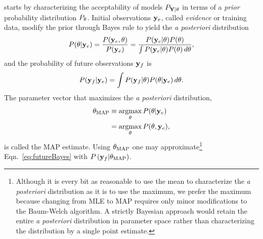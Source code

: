  starts by characterizing the
acceptability of models $P_{{\bf Y}|\theta}$ in terms of a
\emph{prior} probability distribution $P_{\theta}$.  Initial
observations $\mathbf{y}_e$, called \emph{evidence} or training data, modify
the prior through Bayes rule to yield the \emph{a posteriori}
distribution
\begin{equation}
  \label{eq:posteriori}
  P(\theta|\mathbf{y}_e) = \frac{P(\mathbf{y}_e,\theta)}{P(\mathbf{y}_e)} =
  \frac{P(\mathbf{y}_e|\theta)P(\theta)}{\int P(\mathbf{y}_e|\theta)P(\theta)\,
  d\theta},
\end{equation}
and the probability of future observations $\mathbf{y}_f$ is
\begin{equation}
  \label{eq:futureBayes}
  P(\mathbf{y}_f|\mathbf{y}_e) = \int  P(\mathbf{y}_f|\theta) P(\theta|\mathbf{y}_e)\, d\theta.
\end{equation}
The parameter vector that maximizes the \emph{a posteriori}
 distribution,
\begin{subequations}
  \begin{align}
    \label{eq:MAPdefa}
    \theta_{\text{MAP}} &\equiv \operatorname*{argmax}_\theta P(\theta|\mathbf{y}_e) \\
    \label{eq:MAPdefb}
    &= \operatorname*{argmax}_\theta P(\theta,\mathbf{y}_e),
  \end{align}
\end{subequations}
is called the MAP estimate.   Using $\theta_{\text{MAP}}$ one may
approximate\footnote{Although it is every bit as reasonable to use the
  mean to characterize the \emph{a posteriori} distribution as it is to
  use the maximum, we prefer the maximum because changing from MLE to
  MAP requires only minor modifications to the Baum-Welch algorithm.
  A strictly Bayesian approach would retain the entire \emph{a
    posteriori} distribution in parameter space rather than
  characterizing the distribution by a single point estimate.}
Eqn.~\eqref{eq:futureBayes} with $P\left( \mathbf{y}_f|\theta_{
    \text{MAP} } \right)$.

